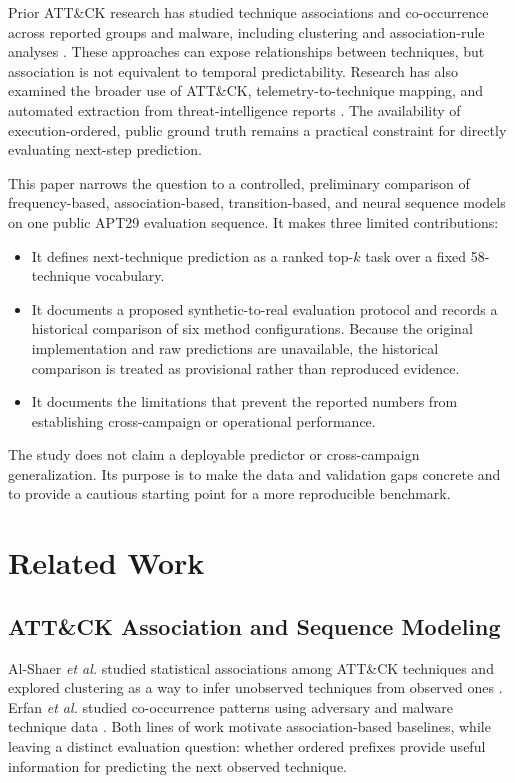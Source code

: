 \documentclass[conference]{IEEEtran}
\begin{document}
Prior ATT\&CK research has studied technique associations and co-occurrence across reported groups and malware, including clustering and association-rule analyses \cite{alshaer2020,rahman2026}. These approaches can expose relationships between techniques, but association is not equivalent to temporal predictability. Research has also examined the broader use of ATT\&CK, telemetry-to-technique mapping, and automated extraction from threat-intelligence reports \cite{jiang2025,lupinacci2026,fayyazi2024,haque2026}. The availability of execution-ordered, public ground truth remains a practical constraint for directly evaluating next-step prediction.

This paper narrows the question to a controlled, preliminary comparison of frequency-based, association-based, transition-based, and neural sequence models on one public APT29 evaluation sequence. It makes three limited contributions:
\begin{itemize}
\item It defines next-technique prediction as a ranked top-$k$ task over a fixed 58-technique vocabulary.
\item It documents a proposed synthetic-to-real evaluation protocol and records a historical comparison of six method configurations. Because the original implementation and raw predictions are unavailable, the historical comparison is treated as provisional rather than reproduced evidence.
\item It documents the limitations that prevent the reported numbers from establishing cross-campaign or operational performance.
\end{itemize}

The study does not claim a deployable predictor or cross-campaign generalization. Its purpose is to make the data and validation gaps concrete and to provide a cautious starting point for a more reproducible benchmark.

\section{Related Work}
\subsection{ATT\&CK Association and Sequence Modeling}
Al-Shaer \emph{et al.} studied statistical associations among ATT\&CK techniques and explored clustering as a way to infer unobserved techniques from observed ones \cite{alshaer2020}. Erfan \emph{et al.} studied co-occurrence patterns using adversary and malware technique data \cite{rahman2026}. Both lines of work motivate association-based baselines, while leaving a distinct evaluation question: whether ordered prefixes provide useful information for predicting the next observed technique.
\end{document}
